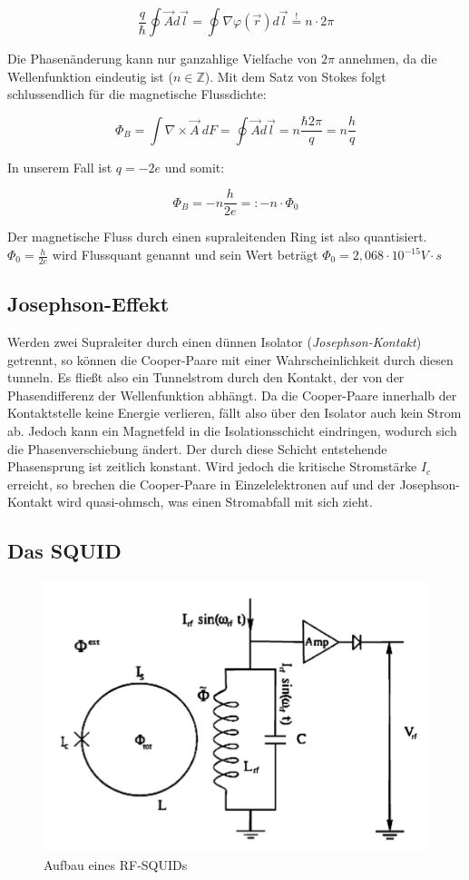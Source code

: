$$\frac{q}{\hbar}\oint \vec A d\vec l = \oint \nabla \varphi(\vec r) d\vec l \stackrel{!}{=} n\cdot2\pi$$

Die Phasenänderung kann nur ganzahlige Vielfache von $2\pi$ annehmen, da die Wellenfunktion eindeutig ist ($n \in \mathbb Z$). Mit dem Satz von Stokes folgt schlussendlich für die magnetische Flussdichte:

$$ \Phi_B = \int \nabla \times \vec A \ dF = \oint \vec A d\vec l = n\frac{\hbar 2\pi}{q} = n\frac{h}{q} $$

In unserem Fall ist $q=-2e$ und somit:

$$\Phi_B = -n\frac{h}{2e} =: -n\cdot \Phi_0$$

Der magnetische Fluss durch einen supraleitenden Ring ist also quantisiert. $\Phi_0 = \frac{h}{2e}$ wird Flussquant genannt und sein Wert beträgt $\Phi_0 = 2,068 \cdot 10^{-15} V\cdot s$

\subsection{Josephson-Effekt}

Werden zwei Supraleiter durch einen dünnen Isolator (\emph{Josephson-Kontakt}) getrennt, so können die Cooper-Paare mit einer Wahrscheinlichkeit durch diesen tunneln. Es fließt also ein Tunnelstrom durch den Kontakt, der von der Phasendifferenz der Wellenfunktion abhängt. Da die Cooper-Paare innerhalb der Kontaktstelle keine Energie verlieren,  fällt also über den Isolator auch kein Strom ab. Jedoch kann ein Magnetfeld in die Isolationsschicht eindringen, wodurch sich die Phasenverschiebung ändert. Der durch diese Schicht entstehende Phasensprung ist zeitlich konstant. Wird jedoch die kritische Stromstärke $I_c$ erreicht, so brechen die Cooper-Paare in Einzelelektronen auf und der Josephson-Kontakt wird quasi-ohmsch, was einen Stromabfall mit sich zieht.

\subsection{Das SQUID}

\begin{figure}[H]
	\centering \includegraphics[width = 0.7 \textwidth]{Bilder/SQUID.jpg}
	\caption{Aufbau eines RF-SQUIDs}
\end{figure}

